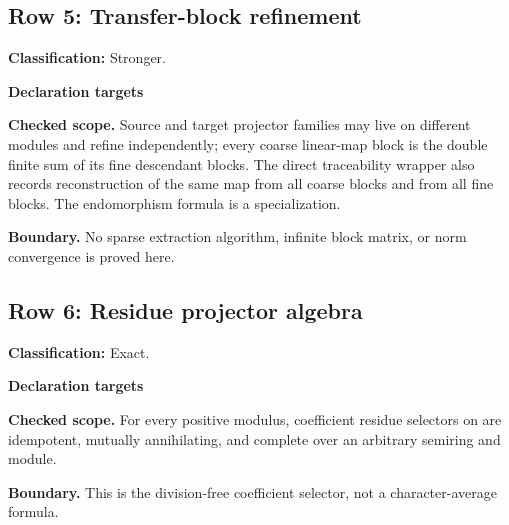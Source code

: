 \subsection{Row 5: Transfer-block refinement}
\label{row:5}
\textbf{Classification:} Stronger.
\par\smallskip\textbf{Declaration targets}\par
{\small\noindent{}\par}
{\small\noindent{}\par}
{\small\noindent{}\par}
\smallskip\textbf{Checked scope.} Source and target projector families may live on different modules and refine independently; every coarse linear-map block is the double finite sum of its fine descendant blocks. The direct traceability wrapper also records reconstruction of the same map from all coarse blocks and from all fine blocks. The endomorphism formula is a specialization.
\par\smallskip\textbf{Boundary.} No sparse extraction algorithm, infinite block matrix, or norm convergence is proved here.
\medskip
{}
\subsection{Row 6: Residue projector algebra}
\label{row:6}
\textbf{Classification:} Exact.
\par\smallskip\textbf{Declaration targets}\par
{\small\noindent{}\par}
{\small\noindent{}\par}
{\small\noindent{}\par}
\smallskip\textbf{Checked scope.} For every positive modulus, coefficient residue selectors on  are idempotent, mutually annihilating, and complete over an arbitrary semiring and module.
\par\smallskip\textbf{Boundary.} This is the division-free coefficient selector, not a character-average formula.
\medskip
{}
